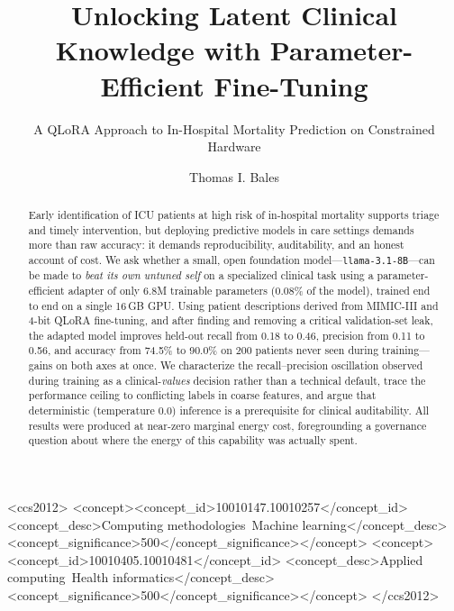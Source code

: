 \documentclass[sigconf,nonacm]{acmart}
\begin{document}
\title{Unlocking Latent Clinical Knowledge with Parameter-Efficient
Fine-Tuning}
\subtitle{A QLoRA Approach to In-Hospital Mortality Prediction on
Constrained Hardware}

\author{Thomas I. Bales}

\renewcommand{\shortauthors}{Bales}

\begin{abstract}
Early identification of ICU patients at high risk of in-hospital mortality
supports triage and timely intervention, but deploying predictive models in
care settings demands more than raw accuracy: it demands reproducibility,
auditability, and an honest account of cost. We ask whether a small, open
foundation model---\texttt{llama-3.1-8B}---can be made to \emph{beat its own
untuned self} on a specialized clinical task using a parameter-efficient
adapter of only 6.8M trainable parameters (0.08\% of the model), trained end
to end on a single 16\,GB GPU. Using patient descriptions derived from
MIMIC-III and 4-bit QLoRA fine-tuning, and after finding and removing a
critical validation-set leak, the adapted model improves held-out recall from
0.18 to 0.46, precision from 0.11 to 0.56, and accuracy from 74.5\% to 90.0\%
on 200 patients never seen during training---gains on both axes at once. We
characterize the recall--precision oscillation observed during training as a
clinical-\emph{values} decision rather than a technical default, trace the
performance ceiling to conflicting labels in coarse features, and argue that
deterministic (temperature 0.0) inference is a prerequisite for clinical
auditability. All results were produced at near-zero marginal energy cost,
foregrounding a governance question about where the energy of this capability
was actually spent.
\end{abstract}

\begin{CCSXML}
<ccs2012>
<concept><concept_id>10010147.10010257</concept_id>
<concept_desc>Computing methodologies~Machine learning</concept_desc>
<concept_significance>500</concept_significance></concept>
<concept><concept_id>10010405.10010481</concept_id>
<concept_desc>Applied computing~Health informatics</concept_desc>
<concept_significance>500</concept_significance></concept>
</ccs2012>
\end{CCSXML}
\end{document}

